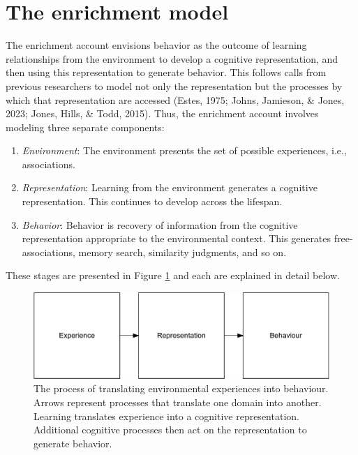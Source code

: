 \documentclass[
  man]{apa6}
\providecommand{\tightlist}{%
  \setlength{\itemsep}{0pt}\setlength{\parskip}{0pt}}
\begin{document}
\hypertarget{the-enrichment-model}{%
\section{The enrichment model}\label{the-enrichment-model}}

The enrichment account envisions behavior as the outcome of learning relationships from the environment to develop a cognitive representation, and then using this representation to generate behavior. This follows calls from previous researchers to model not only the representation but the processes by which that representation are accessed (Estes, 1975; Johns, Jamieson, \& Jones, 2023; Jones, Hills, \& Todd, 2015). Thus, the enrichment account involves modeling three separate components:

\begin{enumerate}
\def\labelenumi{\arabic{enumi}.}
\tightlist
\item
  \emph{Environment}: The environment presents the set of possible experiences, i.e., associations.
\item
  \emph{Representation}: Learning from the environment generates a cognitive representation. This continues to develop across the lifespan.
\item
  \emph{Behavior}: Behavior is recovery of information from the cognitive representation appropriate to the environmental context. This generates free-associations, memory search, similarity judgments, and so on.
\end{enumerate}

These stages are presented in Figure \ref{fig:Figure1} and each are explained in detail below.

\begin{figure}
\centering
\includegraphics{Enrichment_files/figure-latex/Figure1-1.pdf}
\caption{\label{fig:Figure1}The process of translating environmental experiences into behaviour. Arrows represent processes that translate one domain into another. Learning translates experience into a cognitive representation. Additional cognitive processes then act on the representation to generate behavior.}
\end{figure}
\end{document}
